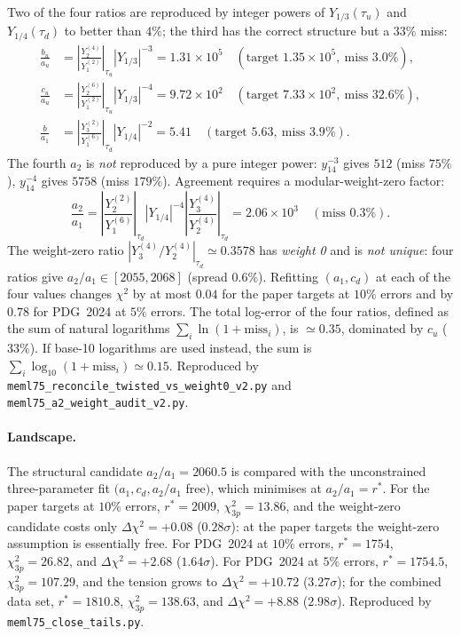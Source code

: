 \documentclass[12pt,a4paper]{article}
\numberwithin{equation}{section}
\begin{document}
Two of the four ratios are reproduced by integer powers of
\(Y_{1/3}(\tau_u)\) and \(Y_{1/4}(\tau_d)\) to better than \(4\%\);
the third has the correct structure but a \(33\%\) miss:
\begin{align}
\frac{b_u}{a_u} &= \left|\frac{Y_2^{(4)}}{Y_1^{(2)}}\right|_{\tau_u} |Y_{1/3}|^{-3} = 1.31\times10^5 \quad (\text{target }1.35\times10^5,\ \text{miss }3.0\%), \\
\frac{c_u}{a_u} &= \left|\frac{Y_2^{(6)}}{Y_1^{(2)}}\right|_{\tau_u} |Y_{1/3}|^{-4} = 9.72\times10^2 \quad (\text{target }7.33\times10^2,\ \text{miss }32.6\%), \\
\frac{b}{a_1} &= \left|\frac{Y_3^{(2)}}{Y_1^{(6)}}\right|_{\tau_d} |Y_{1/4}|^{-2} = 5.41 \quad (\text{target }5.63,\ \text{miss }3.9\%).
\end{align}
The fourth \(a_2\) is \emph{not} reproduced by a pure integer power:
\(y_{14}^{-3}\) gives \(512\) (miss \(75\%\)), \(y_{14}^{-4}\) gives
\(5758\) (miss \(179\%\)). Agreement requires a modular-weight-zero
factor:
\begin{equation}
\frac{a_2}{a_1} = \left|\frac{Y_2^{(2)}}{Y_1^{(6)}}\right|_{\tau_d} |Y_{1/4}|^{-4} \left|\frac{Y_3^{(4)}}{Y_2^{(4)}}\right|_{\tau_d} = 2.06\times10^3 \quad (\text{miss }0.3\%).
\end{equation}
The weight-zero ratio \(\left|Y_3^{(4)}/Y_2^{(4)}\right|_{\tau_d} \simeq 0.3578\)
has \emph{weight 0} and is \emph{not unique}: four ratios give
\(a_2/a_1 \in [2055, 2068]\) (spread \(0.6\%\)). Refitting
\((a_1,c_d)\) at each of the four values changes \(\chi^2\) by
at most \(0.04\) for the paper targets at \(10\%\) errors and by
\(0.78\) for PDG~2024 at \(5\%\) errors. The total log-error of the
four ratios, defined as the sum of natural logarithms
\(\sum_i \ln(1+\mathrm{miss}_i)\), is \(\simeq 0.35\), dominated by
\(c_u\) (\(33\%\)). If base-10 logarithms are used instead, the sum is
\(\sum_i \log_{10}(1+\mathrm{miss}_i) \simeq 0.15\). Reproduced by
\texttt{meml75\_reconcile\_twisted\_vs\_weight0\_v2.py} and
\texttt{meml75\_a2\_weight\_audit\_v2.py}.

\paragraph{Landscape.}
The structural candidate \(a_2/a_1 = 2060.5\) is compared with the
unconstrained three-parameter fit \((a_1,c_d,a_2/a_1\) free$)$,
which minimises at \(a_2/a_1 = r^\ast\). For the paper targets at
\(10\%\) errors, \(r^\ast = 2009\), \(\chi^2_{3p} = 13.86\), and
the weight-zero candidate costs only \(\Delta\chi^2 = +0.08\)
(\(0.28\sigma\)): at the paper targets the weight-zero assumption
is essentially free. For PDG~2024 at \(10\%\) errors,
\(r^\ast = 1754\), \(\chi^2_{3p} = 26.82\), and
\(\Delta\chi^2 = +2.68\) (\(1.64\sigma\)). For PDG~2024 at \(5\%\)
errors, \(r^\ast = 1754.5\), \(\chi^2_{3p} = 107.29\), and the
tension grows to \(\Delta\chi^2 = +10.72\) (\(3.27\sigma\)); for
the combined data set, \(r^\ast = 1810.8\), \(\chi^2_{3p} = 138.63\),
and \(\Delta\chi^2 = +8.88\) (\(2.98\sigma\)). Reproduced by
\texttt{meml75\_close\_tails.py}.
\end{document}
